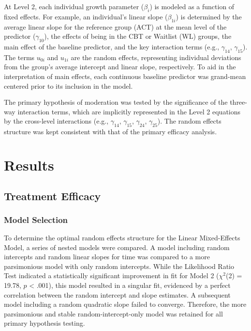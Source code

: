\documentclass[
  english,
  man]{apa6}
\begin{document}
At Level 2, each individual growth parameter (\(\beta_i\)) is modeled as a function of fixed effects. For example, an individual's linear slope (\(\beta_{1i}\)) is determined by the average linear slope for the reference group (ACT) at the mean level of the predictor (\(\gamma_{10}\)), the effects of being in the CBT or Waitlist (WL) groups, the main effect of the baseline predictor, and the key interaction terms (e.g., \(\gamma_{14}\), \(\gamma_{15}\)). The terms \(u_{0i}\) and \(u_{1i}\) are the random effects, representing individual deviations from the group's average intercept and linear slope, respectively. To aid in the interpretation of main effects, each continuous baseline predictor was grand-mean centered prior to its inclusion in the model.

The primary hypothesis of moderation was tested by the significance of the three-way interaction terms, which are implicitly represented in the Level 2 equations by the cross-level interactions (e.g., \(\gamma_{14}\), \(\gamma_{15}\), \(\gamma_{24}\), \(\gamma_{25}\)). The random effects structure was kept consistent with that of the primary efficacy analysis.

\section{Results}\label{results}

\subsection{Treatment Efficacy}\label{treatment-efficacy-1}

\subsubsection{Model Selection}\label{model-selection}

To determine the optimal random effects structure for the Linear Mixed-Effects Model, a series of nested models were compared. A model including random intercepts and random linear slopes for time was compared to a more parsimonious model with only random intercepts. While the Likelihood Ratio Test indicated a statistically significant improvement in fit for Model 2 (\(\chi^2\)(2) = 19.78, \(p\) \textless{} .001), this model resulted in a singular fit, evidenced by a perfect correlation between the random intercept and slope estimates. A subsequent model including a random quadratic slope failed to converge. Therefore, the more parsimonious and stable random-intercept-only model was retained for all primary hypothesis testing.
\end{document}
